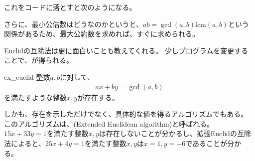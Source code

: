 これをコードに落とすと次のようになる。


さらに、最小公倍数はどうなのかというと、$ab = \gcd(a,b)\mbox{lcm}(a,b)$という関係があるため、最大公約数を求めれば、すぐに求められる。


Euclidの互除法は更に面白いことも教えてくれる。
少しプログラムを変更することで、が得られる。

\begin{Theo}{}{ex_euclid}
整数$a,b$に対して、
\begin{align*}
ax + by = \gcd(a,b)
\end{align*}
を満たすような整数$x,y$が存在する。
\end{Theo}

しかも、存在を示しただけでなく、具体的な値を得るアルゴリズムでもある。
このアルゴリズムは、(Extended Euclidean algorithm)と呼ばれる。
$15x+33y=1$を満たす整数$x,y$は存在しないことが分かるし、拡張Euclidの互除法によると、$25x+4y=1$を満たす整数$x,y$は$x=1,y=-6$であることが分かる。

